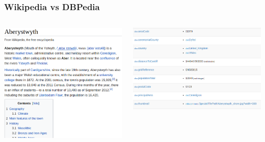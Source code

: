 \documentclass{beamer}
\begin{document}
\begin{frame}
\frametitle{Wikipedia vs DBPedia}
\begin{columns}


\includegraphics[width=\textwidth]{aberwiki.png}


\includegraphics[width=\textwidth]{aberpedia.png}

\end{columns}
\end{frame}
\end{document}
